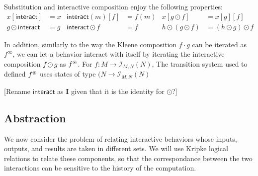 \documentclass[acmsmall,timestamp,review]{acmart}
\newcommand{\kw}[1]{\ensuremath{ \mathsf{#1} }}
\begin{document}
Substitution and interactive composition
enjoy the following properties:
\begin{align*}
  x[\kw{interact}] &= x &
  \kw{interact}(m)[f] &= f(m) &
  x[g \odot f] &= x[g][f] \\
  g \odot \kw{interact} &= g &
  \kw{interact} \odot f &= f &
  h \odot (g \odot f) &= (h \odot g) \odot f
\end{align*}

In addition,
similarly to the way
the Kleene composition $f \cdot g$ can be iterated as $f^\infty$,
we can let a behavior interact with itself
by iterating the interactive composition $f \odot g$ as $f^\oast$.
For $f : M \rightarrow \mathcal{I}_{M,N}(N)$,
The transition system used to defined $f^\oast$
uses states of type $(N \rightarrow \mathcal{I}_{M,N}(N)$

\begin{definition}
\end{definition}

[Rename $\kw{interact}$ as $\mathbf{I}$
given that it is the identity for $\odot$?]


\subsection{Abstraction} \label{sec:monad:abs} %

We now consider the problem of relating interactive behaviors
whose inputs, outputs, and results are taken in different sets.
We will use Kripke logical relations to relate these components,
so that the correspondance between the two interactions
can be sensitive to the history of the computation.
\end{document}
